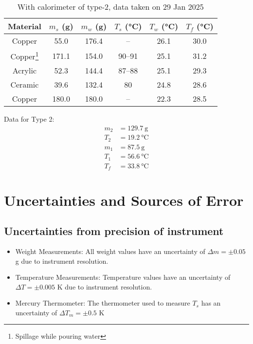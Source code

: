\documentclass[%
 sor,
 jor,
 amsmath,amssymb,
 reprint,%
]{revtex4-2}
\begin{document}
\begin{table}[ht]
\begin{minipage}[b]{0.48\hsize}
    \end{minipage}
\hfill\vline\hfill
    \begin{minipage}[b]{0.48\hsize}\centering
\begin{tabular}{|c|c|c|c|c|c|}
\hline
\textbf{Material} & \textbf{$m_s$ (\si{\gram})} & \textbf{$m_w$ (\si{\gram})} & \textbf{$T_s$ (\si{\celsius})} & \textbf{$T_w$ (\si{\celsius})} & \textbf{$T_f$ (\si{\celsius})} \\
\hline
Copper & 55.0 & 176.4 & \multicolumn{1}{c}{--} & 26.1 & 30.0 \\ %
Copper\footnote{Spillage while pouring water} & 171.1 & 154.0 & 90--91 & 25.1 & 31.2 \\
Acrylic & 52.3 & 144.4 & 87--88 & 25.1 & 29.3 \\ %
Ceramic & 39.6 & 132.4 & 80 & 24.8 & 28.6 \\
Copper & 180.0 & 180.0 & \multicolumn{1}{c}{--} & 22.3 & 28.5 \\
\hline
\end{tabular}
\caption{With calorimeter of type-2, data taken on 29 Jan 2025}
\label{tab:table2}
\vspace{0.5cm}Data for Type 2:\\
\[
\boxed{
\begin{aligned}
m_2 &= 129.7~\si{\gram} \\
T_2 &= 19.2~\si{\celsius} \\
m_1 &= 87.5~\si{\gram} \\
T_1 &= 56.6~\si{\celsius} \\
T_f &= 33.8~\si{\celsius}
\end{aligned}
}
\]
    \end{minipage}
\end{table}





\section{Uncertainties and Sources of Error}
\subsection{Uncertainties from precision of instrument}
\begin{itemize}
    \item Weight Measurements:
    All weight values have an uncertainty of $\Delta m = \pm 0.05$ \si{\gram} due to instrument resolution.    
    \item Temperature Measurements: Temperature values have an uncertainty of $\Delta T = \pm 0.005$ \si{\kelvin} due to instrument resolution. 
\item Mercury Thermometer: The thermometer used to measure $T_s$ has an uncertainty of $\Delta T_m = \pm 0.5$ \si{\kelvin}
\end{itemize}
\end{document}

